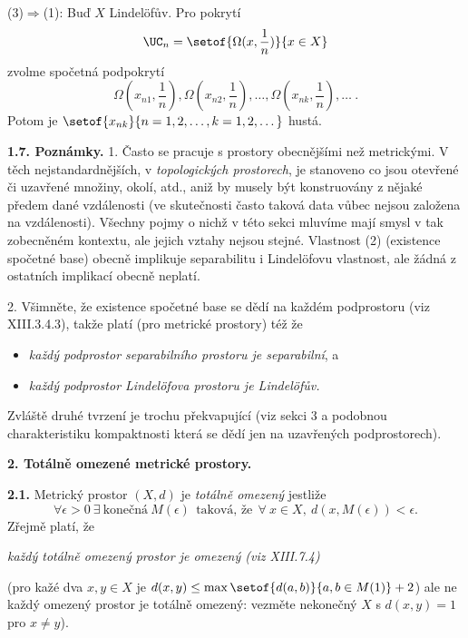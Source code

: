 \documentclass[12pt]{article}
\begin{document}
 \smallskip
 
 (3)$\Rightarrow$(1): Buď $X$ Lindel\"ofův. Pro pokrytí
 $$
 \UC_n=\setof{\Omega(x,\frac1n)}{x\in X}
 $$
 zvolme spočetná podpokrytí
 $$
 \Omega(x_{n1},\frac1n),\Omega(x_{n2},\frac1n),\dots,\Omega(x_{nk},\frac1n),\dots \ .
 $$
 Potom je $\setof{x_{nk}}{n=1,2,\dots,k=1,2,\dots}$ 
hustá. \sq
 
 \bigskip
 
 {\bf 1.7. Poznámky.} 1. Často se pracuje s prostory obecnějšími než metrickými. V těch nejstandardnějších, v
 {\em topologických prostorech}, je stanoveno co jsou otevřené či uzavřené množiny, okolí, atd., aniž by musely být konstruovány z nějaké předem dané vzdálenosti
 (ve skutečnosti často taková data vůbec nejsou založena na vzdálenosti). Všechny pojmy o nichž v této sekci mluvíme mají smysl v tak zobecněném kontextu, ale jejich vztahy nejsou stejné. Vlastnost (2) (existence spočetné base) obecně implikuje separabilitu i Lindel\"ofovu vlastnost, ale žádná z ostatních implikací obecně neplatí.
 
 2. Všimněte, že existence spočetné base se dědí na každém podprostoru (viz XIII.3.4.3), takže platí (pro metrické prostory) též že
 \begin{itemize}
 \item {\em každý podprostor separabilního prostoru je separabilní}, a
 \item {\em každý podprostor Lindel\"ofova prostoru je Lindel\"ofův.}
 \end{itemize}
Zvláště druhé tvrzení je trochu překvapující (viz sekci 3 a podobnou charakteristiku kompaktnosti která se dědí jen  na uzavřených podprostorech).
 


 
 \vskip10mm
 
 {\large\bf 2. Totálně omezené metrické prostory.}
 
 \bigskip
 
 {\bf 2.1.} Metrický prostor  $(X,d)$ je {\em totálně omezený} jestliže
 $$
 \forall \epsilon>0\ \exists\ \text{konečná}\ M(\epsilon)\ \ \text{taková, že}\ \ \forall\ x\in X,\ d(x,M(\epsilon))<\epsilon.
 $$
Zřejmě platí, že
 
 \smallskip
 
 \centerline{\em každý totálně omezený prostor je omezený (viz XIII.7.4)}
 
 \smallskip
 
 \noindent (pro kažé dva $x,y\in X$ je $d(x,y)\leq \max\setof{d(a,b)}{a,b\in M(1)}+2$)  ale ne každý omezený prostor je totálně omezený:  vezměte nekonečný $X$ s $d(x,y)=1$ pro $x\neq y$).
 
\end{document}
